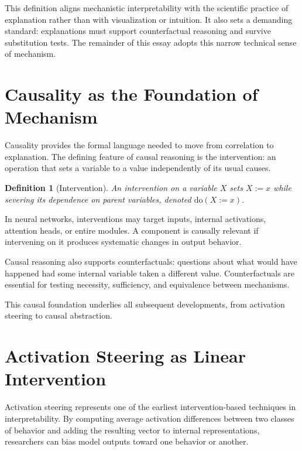 \documentclass[11pt]{article}
\newtheorem{definition}{Definition}
\theoremstyle{remark}
\newcommand{\doop}{\mathrm{do}}
\begin{document}
This definition aligns mechanistic interpretability with the scientific practice of explanation rather than with visualization or intuition. It also sets a demanding standard: explanations must support counterfactual reasoning and survive substitution tests. The remainder of this essay adopts this narrow technical sense of mechanism.

\section{Causality as the Foundation of Mechanism}

Causality provides the formal language needed to move from correlation to explanation. The defining feature of causal reasoning is the intervention: an operation that sets a variable to a value independently of its usual causes.

\begin{definition}[Intervention]
An intervention on a variable $X$ sets $X := x$ while severing its dependence on parent variables, denoted $\doop(X := x)$.
\end{definition}

In neural networks, interventions may target inputs, internal activations, attention heads, or entire modules. A component is causally relevant if intervening on it produces systematic changes in output behavior.

Causal reasoning also supports counterfactuals: questions about what would have happened had some internal variable taken a different value. Counterfactuals are essential for testing necessity, sufficiency, and equivalence between mechanisms.

This causal foundation underlies all subsequent developments, from activation steering to causal abstraction.

\section{Activation Steering as Linear Intervention}

Activation steering represents one of the earliest intervention-based techniques in interpretability. By computing average activation differences between two classes of behavior and adding the resulting vector to internal representations, researchers can bias model outputs toward one behavior or another.
\end{document}
